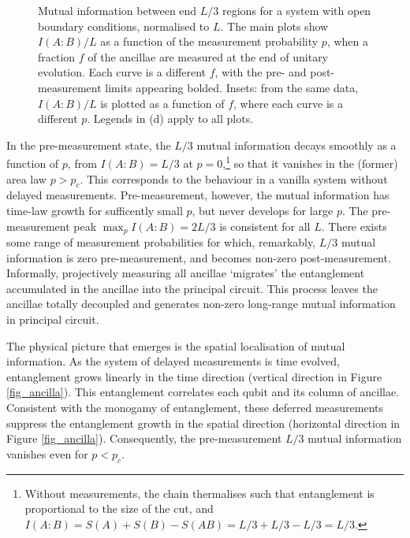 \documentclass[10pt]{article}
\begin{document}
\begin{figure}
\centering
{}
\caption{Mutual information between end $L/3$ regions for a system with open boundary conditions, normalised to $L$. The main plots show $I(A:B)/L$ as a function of the measurement probability $p$, when a fraction $f$ of the ancillae are measured at the end of unitary evolution. Each curve is a different $f$, with the pre- and post-measurement limits appearing bolded. Insets: from the same data, $I(A:B)/L$ is plotted as a function of $f$, where each curve is a different $p$. Legends in (d) apply to all plots.}
\label{fig_ancL3}
\end{figure}

In the pre-measurement state, the $L/3$ mutual information decays smoothly as a function of $p$, from $I(A:B)=L/3$ at $p=0$,\footnote{Without measurements, the chain thermalises such that entanglement is proportional to the size of the cut, and $I(A:B) = S(A) + S(B) - S(AB) = L/3+L/3-L/3=L/3$.} so that it vanishes in the (former) area law $p>p_c$. This corresponds to the behaviour in a vanilla system without delayed measurements. Pre-measurement, however, the mutual information has time-law growth for sufficently small $p$, but never develops for large $p$. The pre-measurement peak $\max_p I(A:B)=2L/3$ is consistent for all $L$. There exists some range of measurement probabilities for which, remarkably, $L/3$ mutual information is zero pre-measurement, and becomes non-zero post-measurement. Informally, projectively measuring all ancillae `migrates' the entanglement accumulated in the ancillae into the principal circuit. This process leaves the ancillae totally decoupled and generates non-zero long-range mutual information in principal circuit.

The physical picture that emerges is the spatial localisation of mutual information. As the system of delayed measurements is time evolved, entanglement grows linearly in the time direction (vertical direction in Figure \ref{fig_ancilla}). This entanglement correlates each qubit and its column of ancillae. Consistent with the monogamy of entanglement, these deferred measurements suppress the entanglement growth in the spatial direction (horizontal direction in Figure \ref{fig_ancilla}). Consequently, the pre-measurement $L/3$ mutual information vanishes even for $p<p_c$. 
\end{document}
